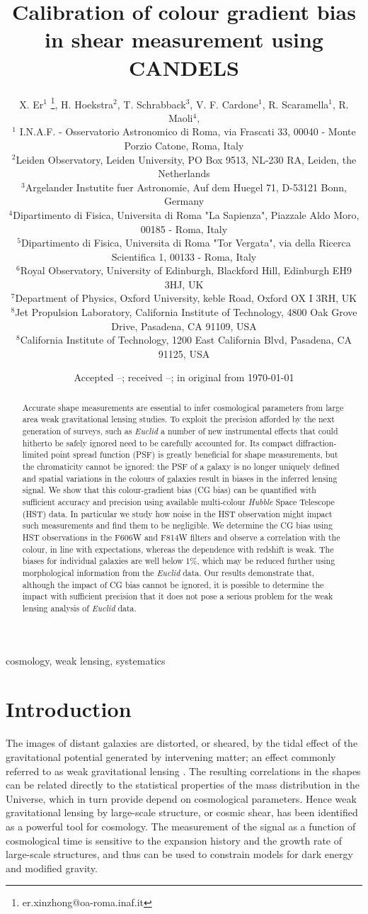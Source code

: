 \documentclass[useAMS,usenatbib]{mnras}
\title[Colour gradient bias]
{Calibration of colour gradient bias in shear measurement using CANDELS}
\author[X. Er et al.]%
{
X. Er$^1$ \thanks{er.xinzhong@oa-roma.inaf.it},
H. Hoekstra$^2$, T. Schrabback$^3$, V. F. Cardone$^1$, R. Scaramella$^1$, R. Maoli$^4$,
\newauthor{M. Vicinanza$^{1,4,5}$, B. Gillis$^{6}$ L. Miller$^{7}$, J. Rhodes$^{8,9}$}
\\
$^1$ I.N.A.F. - Osservatorio Astronomico di Roma, via Frascati 33, 00040 - Monte Porzio Catone, Roma, Italy\\
$^2$Leiden Observatory, Leiden University, PO Box 9513, NL-230 RA, Leiden, the Netherlands \\
$^3$Argelander Instutite fuer Astronomie, Auf dem Huegel 71, D-53121 Bonn, Germany\\
$^4$Dipartimento di Fisica, Universita di Roma "La Sapienza", Piazzale Aldo Moro, 00185 - Roma, Italy\\
$^5$Dipartimento di Fisica, Universita di Roma "Tor Vergata", via della Ricerca Scientifica 1, 00133 - Roma, Italy\\
$^6$Royal Observatory, University of Edinburgh, Blackford Hill, Edinburgh EH9 3HJ, UK\\
$^7$Department of Physics, Oxford University, keble Road, Oxford OX I 3RH, UK\\
$^8$Jet Propulsion Laboratory, California Institute of Technology, 4800 Oak Grove Drive, Pasadena, CA 91109, USA\\
$^8$California Institute of Technology, 1200 East California Blvd, Pasadena, CA 91125, USA
}
\date{Accepted --;  received --;  in original from \today}
\begin{document}
\maketitle

\begin{abstract}
Accurate shape measurements are essential to infer cosmological parameters from large area weak gravitational lensing studies. To exploit the precision afforded by the next generation of surveys, such as 
{\it Euclid} a number of new instrumental effects that could hitherto be safely ignored need to be carefully accounted for. Its compact diffraction-limited point spread function (PSF) is greatly beneficial for shape measurements, but the chromaticity cannot be ignored: the PSF of a galaxy is no longer uniquely defined 
and spatial variations in the colours of galaxies result in biases in the inferred lensing signal.  We show that this colour-gradient bias (CG bias) can be quantified with sufficient accuracy and precision using available multi-colour {\it Hubble} Space Telescope (HST) data. In particular we study how noise in the HST observation might impact such measurements and find them to be negligible. We determine the CG bias using HST observations in the F606W and F814W filters and observe a correlation with the colour, in line with expectations, whereas the dependence with redshift is weak. The biases for individual galaxies are well below 1\%, which may be reduced further using morphological information from the {\it Euclid} data.
Our results demonstrate that, although the impact of CG bias cannot be ignored, it is possible to determine the impact with sufficient precision that it does not pose a serious problem for the weak lensing analysis of {\it Euclid} data.
\end{abstract}
\begin{keywords} cosmology, weak lensing, systematics
\end{keywords}


\section{Introduction}

The images of distant galaxies are distorted, or sheared, by the tidal effect of the gravitational  potential generated by intervening matter; an effect commonly referred to as weak gravitational lensing \citep[see e.g.][for a detailed introduction]{Bartelmann01}. The resulting correlations in the shapes can be related directly to the statistical properties of the mass distribution in the Universe, which in turn provide depend on cosmological parameters. Hence weak gravitational lensing by large-scale structure, or cosmic shear, has been identified as a powerful tool for cosmology. The measurement of the signal as a function of cosmological time is sensitive to the expansion history and the growth rate of large-scale structures, and thus can be used to constrain models for dark energy and modified gravity.
\end{document}
